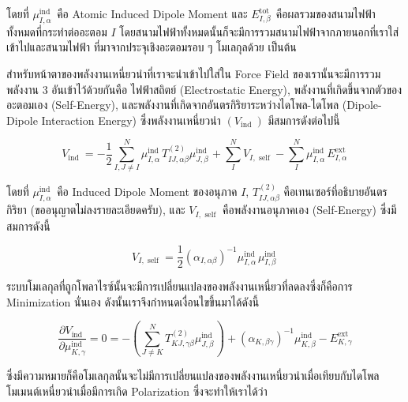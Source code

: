 \noindent โดยที่ $\mu_{I, \alpha}^{\text{ind }}$ คือ Atomic Induced Dipole Moment และ $E_{I, \beta}^{\text{tot }}$
คือผลรวมของสนามไฟฟ้าทั้งหมดที่กระทำต่ออะตอม $I$ โดยสนามไฟฟ้าทั้งหมดนั้นก็จะมีการรวมสนามไฟฟ้าจากภายนอกที่เราใส่เข้าไปและสนามไฟฟ้า%
ที่มาจากประจุเชิงอะตอมรอบ ๆ โมเลกุลด้วย เป็นต้น

สำหรับหน้าตาของพลังงานเหนี่ยวนำที่เราจะนำเข้าไปใส่ใน Force Field ของเรานั้นจะมีการรวมพลังงาน 3 อันเข้าไว้ด้วยกันคือ ไฟฟ้าสถิตย์
(Electrostatic Energy), พลังงานที่เกิดขึ้นจากตัวของอะตอมเอง (Self-Energy), และพลังงานที่เกิดจากอันตรกิริยาระหว่างไดโพล-ไดโพล
(Dipole-Dipole Interaction Energy) ซึ่งพลังงานเหนี่ยวนำ $(V_{\text{ind }})$ มีสมการดังต่อไปนี้\autocite{vesely1977}

\begin{equation}
  V_{\text{ind }}
  =
  -\frac{1}{2} \sum_{I, J
    \neq I}^N \mu_{I, \alpha}^{\text{ind }} T_{I J, \alpha \beta}^{(2)}
  \mu_{J, \beta}^{\text{ind }}
  + \sum_I^N V_{I, \text{ self }}
  - \sum_I^N \mu_{I, \alpha}^{\text{ind }} E_{I, \alpha}^{\text{ext }}
\end{equation}

\noindent โดยที่ $\mu_{I, \alpha}^{\text{ind }}$ คือ Induced Dipole Moment ของอนุภาค $I$,
$T_{I J, \alpha \beta}^{(2)}$ คือเทนเซอร์ที่อธิบายอันตรกิริยา (ขออนุญาตไม่ลงรายละเอียดครับ), และ $V_{I, \text{ self }}$
คือพลังงานอนุภาคเอง (Self-Energy) ซึ่งมีสมการดังนี้

\begin{equation}
  V_{I, \text{ self }}
  =
  \frac{1}{2}\left(\alpha_{I, \alpha \beta}\right)^{-1} \mu_{I, \alpha}^{\text{ind }} \mu_{I, \beta}^{\text{ind }}
\end{equation}

ระบบโมเลกุลที่ถูกโพลาไรซ์นั้นจะมีการเปลี่ยนแปลงของพลังงานเหนี่ยวที่ลดลงซึ่งก็คือการ Minimization นั่นเอง ดังนั้นเราจึงกำหนดเงื่อนไขขึ้นมาได้ดังนี้

\begin{equation}
  \label{eq:der_induction_energy}
  \frac{\partial V_{\text{ind }}}{\partial \mu_{K, \gamma}^{\text{ind }}}
  =
  0
  =
  - \left(\sum_{J \neq K}^N T_{K J, \gamma \beta}^{(2)} \mu_{J, \beta}^{\text{ind }}\right)
  + \left(\alpha_{K, \beta \gamma}\right)^{-1} \mu_{K, \beta}^{\text{ind }}
  - E_{K, \gamma}^{\text{ext }}
\end{equation}

\noindent ซึ่งมีความหมายก็คือโมเลกุลนั้นจะไม่มีการเปลี่ยนแปลงของพลังงานเหนี่ยวนำเมื่อเทียบกับไดโพลโมเมนต์เหนี่ยวนำเมื่อมีการเกิด Polarization
ซึ่งจะทำให้เราได้ว่า

